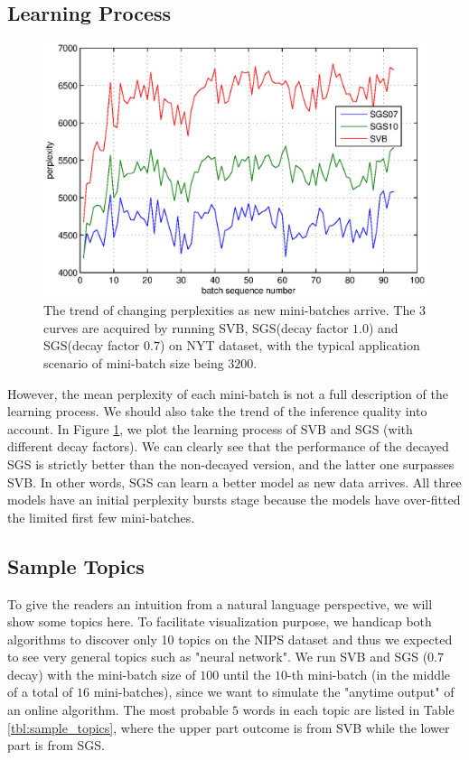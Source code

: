 \documentclass{article} %
\begin{document}
\subsection{Learning Process}
\begin{figure}[ht]
\vskip 0.2in
\begin{center}
\centerline{\includegraphics[width=0.5\columnwidth]{pics/pro2.eps}}
\caption{The trend of changing perplexities as new mini-batches arrive. The 3 curves are acquired by running SVB, SGS(decay factor $1.0$) and SGS(decay factor $0.7$) on NYT dataset, with the typical application scenario of mini-batch size being $3200$. }
\label{fig:pro}
\end{center}
\vskip -0.2in
\end{figure} 
However, the mean perplexity of each mini-batch is not a full description of the learning process. We should also take the trend of the inference quality into account. In Figure \ref{fig:pro}, we plot the learning process of SVB and SGS (with different decay factors). We can clearly see that the performance of the decayed SGS is strictly better than the non-decayed version, and the latter one surpasses SVB. In other words, SGS can learn a better model as new data arrives. All three models have an initial perplexity bursts stage because the models have over-fitted the limited first few mini-batches. 

\subsection{Sample Topics}
To give the readers an intuition from a natural language perspective, we will show some topics here. To facilitate visualization purpose, we handicap both algorithms to discover only 10 topics on the NIPS dataset and thus we expected to see very general topics such as "neural network". We run SVB and SGS ($0.7$ decay) with the mini-batch size of $100$ until the $10$-th mini-batch (in the middle of a total of $16$ mini-batches), since we want to simulate the "anytime output" of an online algorithm. The most probable $5$ words in each topic are listed in Table \ref{tbl:sample_topics}, where the upper part outcome is from SVB while the lower part is from SGS.
\end{document}
